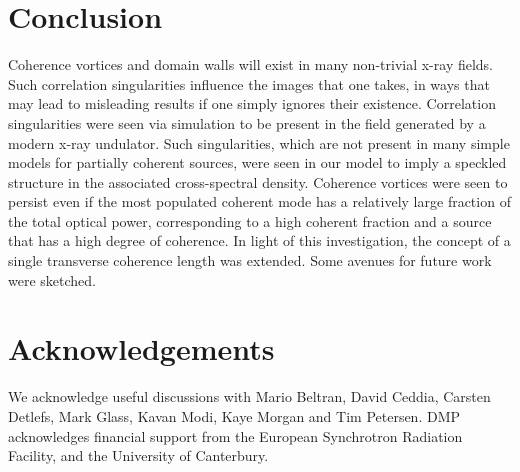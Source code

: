 \documentclass[%
 reprint,
 amsmath,amssymb,
 aps,
]{revtex4-1}
\begin{document}
\section{Conclusion}

Coherence vortices and domain walls will exist in many non-trivial x-ray fields.  Such correlation singularities influence the images that one takes, in ways that may lead to misleading results if one simply ignores their existence.  Correlation singularities were seen via simulation to be present in the field generated by a modern x-ray undulator. Such singularities, which are not present in many simple models for partially coherent sources, were seen in our model to imply a speckled structure in the associated cross-spectral density.  Coherence vortices were seen to persist even if the most populated coherent mode has a relatively large fraction of the total optical power, corresponding to a high coherent fraction and a source that has a high degree of coherence. In light of this investigation, the concept of a single transverse coherence length was extended.   Some avenues for future work were sketched.  

\section*{Acknowledgements}

We acknowledge useful discussions with Mario Beltran, David Ceddia, Carsten Detlefs, Mark Glass, Kavan Modi, Kaye Morgan and Tim Petersen. DMP acknowledges financial support from the European Synchrotron Radiation Facility, and the University of Canterbury.  


\end{document}
